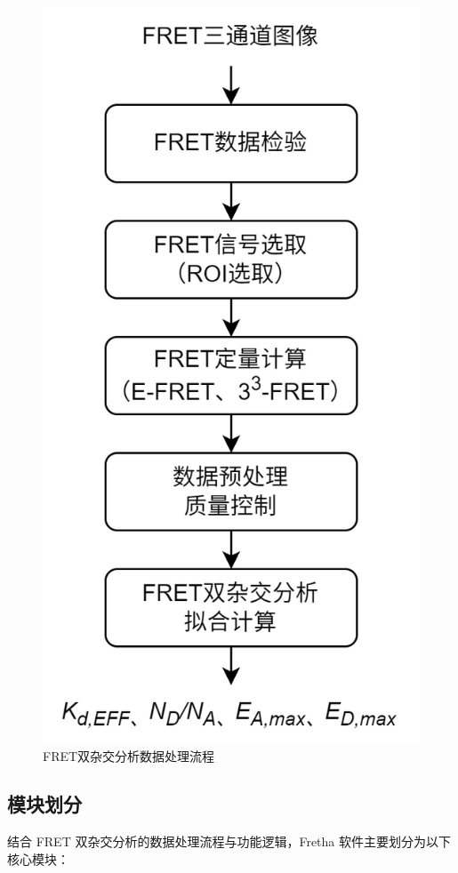 \begin{figure}[hbtp]
    \centering
    \includegraphics[width=0.4\linewidth]{../figures/2/2_FRET双杂交分析数据处理流程.png}
    \caption{FRET双杂交分析数据处理流程}
    \label{fig:tha_data_process}
\end{figure}

\fi

\subsection{模块划分}

结合 FRET 双杂交分析的数据处理流程与功能逻辑，Fretha 软件主要划分为以下核心模块：


